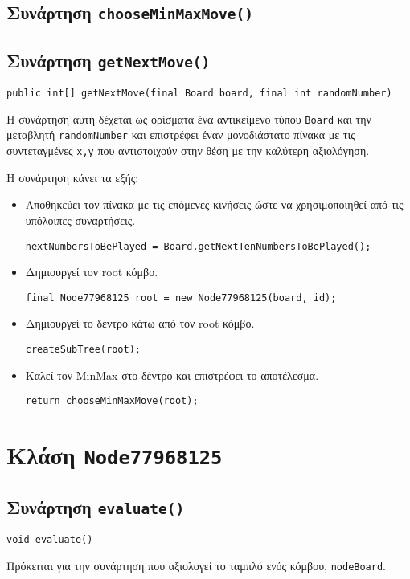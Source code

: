 \subsection{Συνάρτηση \texttt{chooseMinMaxMove()}}

\subsection{Συνάρτηση \texttt{getNextMove()}}
\begin{lstlisting}[style=declaration]
public int[] getNextMove(final Board board, final int randomNumber)
\end{lstlisting}
Η συνάρτηση αυτή δέχεται ως ορίσματα ένα αντικείμενο τύπου \lstinline!Board! και
την μεταβλητή \lstinline!randomNumber! και επιστρέφει έναν
μονοδιάστατο πίνακα με τις συντεταγμένες \lstinline!x,y!
που αντιστοιχούν στην θέση με την καλύτερη αξιολόγηση.

Η συνάρτηση κάνει τα εξής:
\begin{itemize}
\item Αποθηκεύει τον πίνακα με τις επόμενες κινήσεις ώστε να χρησιμοποιηθεί από τις υπόλοιπες συναρτήσεις.
\begin{lstlisting}[style=chunk]
nextNumbersToBePlayed = Board.getNextTenNumbersToBePlayed();
\end{lstlisting}

\item Δημιουργεί τον root κόμβο.
\begin{lstlisting}[style=chunk]
final Node77968125 root = new Node77968125(board, id);
\end{lstlisting}

\item Δημιουργεί το δέντρο κάτω από τον root κόμβο.
\begin{lstlisting}[style=chunk]
createSubTree(root);
\end{lstlisting}

\item Καλεί τον MinMax στο δέντρο και επιστρέφει το αποτέλεσμα.
\begin{lstlisting}[style=chunk]
return chooseMinMaxMove(root);
\end{lstlisting}
\end{itemize}

\section{Κλάση \texttt{Node77968125}}
\subsection{Συνάρτηση \texttt{evaluate()}}
\begin{lstlisting}[style=declaration]
void evaluate()
\end{lstlisting}
Πρόκειται για την συνάρτηση που αξιολογεί το ταμπλό ενός κόμβου, \lstinline!nodeBoard!.

